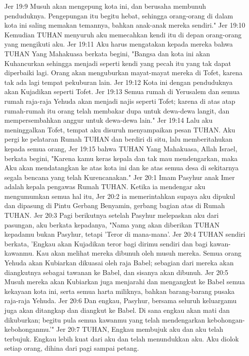 Jer 19:9  Musuh akan mengepung kota ini, dan berusaha membunuh penduduknya. Pengepungan itu begitu hebat, sehingga orang-orang di dalam kota ini saling memakan temannya, bahkan anak-anak mereka sendiri."
Jer 19:10  Kemudian TUHAN menyuruh aku memecahkan kendi itu di depan orang-orang yang mengikuti aku.
Jer 19:11  Aku harus mengatakan kepada mereka bahwa TUHAN Yang Mahakuasa berkata begini, "Bangsa dan kota ini akan Kuhancurkan sehingga menjadi seperti kendi yang pecah itu yang tak dapat diperbaiki lagi. Orang akan menguburkan mayat-mayat mereka di Tofet, karena tak ada lagi tempat pekuburan lain.
Jer 19:12  Kota ini dengan penduduknya akan Kujadikan seperti Tofet.
Jer 19:13  Semua rumah di Yerusalem dan semua rumah raja-raja Yehuda akan menjadi najis seperti Tofet; karena di atas atap rumah-rumah itu orang telah membakar dupa untuk dewa-dewa langit, dan mempersembahkan anggur untuk dewa-dewa lain."
Jer 19:14  Lalu aku meninggalkan Tofet, tempat aku disuruh menyampaikan pesan TUHAN. Aku pergi ke pelataran Rumah TUHAN dan berdiri di situ, lalu memberitahukan kepada semua orang,
Jer 19:15  bahwa TUHAN Yang Mahakuasa, Allah Israel, berkata begini, "Karena kamu keras kepala dan tak mau mendengarkan, maka Aku akan mendatangkan ke atas kota ini dan ke atas semua desa di sekitarnya segala bencana yang telah Kurencanakan."
Jer 20:1  Imam Pasyhur anak Imer adalah kepala pengawas Rumah TUHAN. Ketika ia mendengar aku mengumumkan semua hal itu,
Jer 20:2  ia memerintahkan supaya aku dipukul dan dipasung di Pintu Gerbang Benyamin, gerbang bagian atas di Rumah TUHAN.
Jer 20:3  Pagi berikutnya setelah Pasyhur melepaskan aku dari pasungan, aku berkata kepadanya, "Nama yang akan diberikan TUHAN kepadamu bukan Pasyhur, tetapi 'Teror di mana-mana'.
Jer 20:4  TUHAN sendiri berkata, 'Engkau akan Kujadikan teror bagi dirimu sendiri dan bagi kawan-kawanmu. Kau akan melihat mereka dibunuh oleh musuh mereka. Semua orang Yehuda akan Kubiarkan dikuasai oleh raja Babel; sebagian dari mereka akan diangkutnya sebagai tawanan ke Babel, dan sisanya akan dibunuh.
Jer 20:5  Musuh mereka akan Kubiarkan juga menjarahi dan mengangkut ke Babel semua kekayaan kota ini, serta semua harta miliknya, bahkan barang-barang pusaka raja-raja Yehuda.
Jer 20:6  Dan engkau, Pasyhur, bersama seluruh keluargamu juga akan ditangkap dan diangkut ke Babel. Di sana engkau akan mati dan dikuburkan; begitu pula semua kawanmu yang telah mendengarkan kebohongan-kebohonganmu.'"
Jer 20:7  TUHAN, Engkau membujuk aku dan aku telah terbujuk. Engkau lebih kuat dari aku dan telah menundukkan aku. Aku diolok setiap orang, dihina dari pagi sampai petang.

